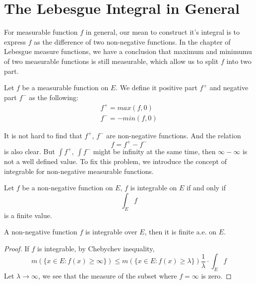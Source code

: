 \documentclass[lang=en, 12pt]{elegantbook}
\begin{document}
        \section{The Lebesgue Integral in General}
            For measurable function $f$ in general, our mean to construct it's integral is to express $f$ as the difference of
        two non-negative functions. In the chapter of Lebesgue measure functions, we have a conclusion that maximum and minimumu of two 
        measurable functions is still measurable, which allow us to split $f$ into two part.
            \begin{definition}
                Let $f$ be a measurable function on $E$. We define it positive part $f^+$ and negative part $f^-$ as the following:
                \begin{equation*}
                    \begin{aligned}
                        f^+ = max(f, 0)\\
                        f^- = -min(f, 0) 
                    \end{aligned}
                \end{equation*} 
            \end{definition}
            It is not hard to find that $f^+$, $f^-$ are non-negative functions. And the relation 
            $$f = f^+ - f^-$$
        is also clear. But $\int f^+,  \ \int f^-$ might be infinity at the same time, then $\infty - \infty$ is not a well defined value. To fix this
        problem, we introduce the concept of integrable for non-negative measurable functions.
            \begin{definition}[Integrable]
                Let $f$ be a non-negative function on $E$, $f$ is integrable on $E$ if and only if $$\int_E f$$
            is a finite value.
            \end{definition}
            \begin{proposition}\label{IntegrableFiniteAE}
                A non-negative function $f$ is integrable over $E$, then it is finite a.e. on $E$.
            \end{proposition}
            \begin{proof}
                If $f$ is integrable, by Chebychev inequality,
                $$m(\{x \in E: f(x) \geq \infty\}) \leq m(\{x \in E: f(x) \geq \lambda\}) \frac{1}{\lambda} \cdot \int_E f$$
                Let $\lambda \to \infty$, we see that the measure of the subset where $f=\infty$ is zero.
            \end{proof}
\end{document}
